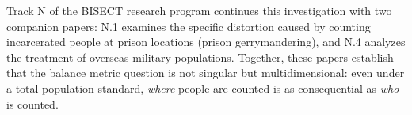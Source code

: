 Track N of the BISECT research program continues this investigation with two companion papers: N.1 examines the specific distortion caused by counting incarcerated people at prison locations (prison gerrymandering), and N.4 analyzes the treatment of overseas military populations. Together, these papers establish that the balance metric question is not singular but multidimensional: even under a total-population standard, \emph{where} people are counted is as consequential as \emph{who} is counted.
